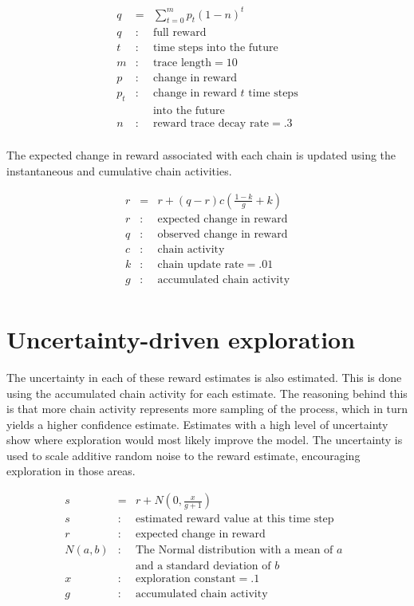 \documentclass[oneside,twocolumn]{article}
\begin{document}
\begin{eqnarray*}
q &= & \sum_{t=0}^m p_t (1 - n)^{t}\\ 
q &:& \mbox{full reward} \\
t &:& \mbox{time steps into the future} \\
m &:& \mbox{trace length} = 10\\
p &:& \mbox{change in reward}\\
p_t &:& \mbox{change in reward $t$ time steps}\\
&& \mbox{into the future}\\
n &:& \mbox{reward trace decay rate} = .3\\
\end{eqnarray*}

The expected change in reward associated with each chain is updated using the instantaneous and cumulative chain activities.

\begin{eqnarray*}
r &= & r + (q - r)c \left ( \frac{1 - k}{g} + k \right)\\ 
r &:& \mbox{expected change in reward} \\
q &:& \mbox{observed change in reward} \\
c &:& \mbox{chain activity} \\
k &:& \mbox{chain update rate} = .01 \\
g &:& \mbox{accumulated chain activity} \\
\end{eqnarray*}

\section*{\color{copper} Uncertainty-driven exploration}

The uncertainty in each of these reward estimates is also estimated. This is done using the accumulated chain activity for each estimate. The reasoning behind this is that more chain activity represents more sampling of the process, which in turn yields a higher confidence estimate. 
Estimates with a high level of uncertainty show where exploration would most likely improve the model. The uncertainty is used to scale additive random noise to the reward estimate, encouraging exploration in those areas.

\begin{eqnarray*}
s &= & r + N \left ( 0, \frac{x}{g + 1} \right )\\ 
s &:& \mbox{estimated reward value at this time step} \\
r &:& \mbox{expected change in reward} \\
N(a,b) &:& \mbox{The Normal distribution with a mean of $a$ } \\
&& \mbox{and a standard deviation of $b$} \\
x &:& \mbox{exploration constant} = .1 \\
g &:& \mbox{accumulated chain activity} \\
\end{eqnarray*}
\end{document}
